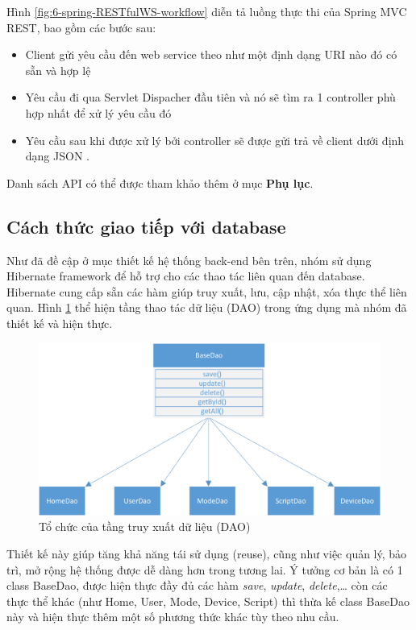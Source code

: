 \documentclass[12pt,a4paper,oneside]{extbook}
\begin{document}
Hình \ref{fig:6-spring-RESTfulWS-workflow} diễn tả luồng thực thi của Spring MVC REST, bao gồm các bước sau:

\begin{itemize}[topsep=1mm,itemsep=-0.5mm]
\item Client gửi yêu cầu đến web service theo như một định dạng URI nào đó có sẵn và hợp lệ
\item Yêu cầu đi qua Servlet Dispacher đầu tiên và nó sẽ tìm ra 1 controller phù hợp nhất để xử lý yêu cầu đó
\item Yêu cầu sau khi được xử lý bởi controller sẽ được gửi trả về client dưới định dạng JSON \cite{rest-controller}.
\vspace{1mm}
\end{itemize}

Danh sách API có thể được tham khảo thêm ở mục \textbf{Phụ lục}.

\subsection{Cách thức giao tiếp với database}
Như đã đề cập ở mục thiết kế hệ thống back-end bên trên, nhóm sử dụng Hibernate framework để hỗ trợ cho các thao tác liên quan đến database. Hibernate cung cấp sẵn các hàm giúp truy xuất, lưu, cập nhật, xóa thực thể liên quan. Hình \ref{fig:6-DAO-structure} thể hiện tầng thao tác dữ liệu (DAO) trong ứng dụng mà nhóm đã thiết kế và hiện thực.

\begin{figure}[h]
  \centering
    \includegraphics[width=12cm]{6-DAO-structure}
  \caption{ Tổ chức của tầng truy xuất dữ liệu (DAO)}\label{fig:6-DAO-structure}
\end{figure}

Thiết kế này giúp tăng khả năng tái sử dụng (reuse), cũng như việc quản lý, bảo trì, mở rộng hệ thống được dễ dàng hơn trong tương lai. Ý tưởng cơ bản là có 1 class BaseDao, được hiện thực đầy đủ các hàm \textit{save}, \textit{update}, \textit{delete},\dots\hspace{0mm} còn các thực thể khác (như Home, User, Mode, Device, Script) thì thừa kế class BaseDao này và hiện thực thêm một số phương thức khác tùy theo nhu cầu.
\end{document}
